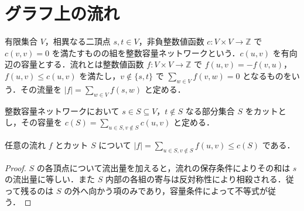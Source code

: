 \section{グラフ上の流れ}
\begin{defn}[整数容量ネットワーク]
有限集合 $V$，相異なる二頂点 $s,t\in V$，非負整数値函数 $c:V\times V\to\mathbb Z$ で $c(v,v)=0$ を満たすものの組を整数容量ネットワークという．$c(u,v)$ を有向辺の容量とする．流れとは整数値函数 $f:V\times V\to\mathbb Z$ で $f(u,v)=-f(v,u)$，$f(u,v)\leq c(u,v)$ を満たし，$v\notin\{s,t\}$ で $\sum_{w\in V} f(v,w)=0$ となるものをいう．その流量を $|f|=\sum_{w\in V}f(s,w)$ と定める．
\end{defn}
\begin{defn}[カットと容量]
整数容量ネットワークにおいて $s\in S\subseteq V$，$t\notin S$ なる部分集合 $S$ をカットとし，その容量を $c(S)=\sum_{u\in S,v\notin S}c(u,v)$ と定める．
\end{defn}
\begin{prop}[流量のカットによる上界]
任意の流れ $f$ とカット $S$ について $|f|=\sum_{u\in S,v\notin S}f(u,v)\leq c(S)$ である．
\end{prop}
\begin{proof}
$S$ の各頂点について流出量を加えると，流れの保存条件によりその和は $s$ の流出量に等しい．また $S$ 内部の各組の寄与は反対称性により相殺される．従って残るのは $S$ の外へ向かう項のみであり，容量条件によって不等式が従う．
\end{proof}
